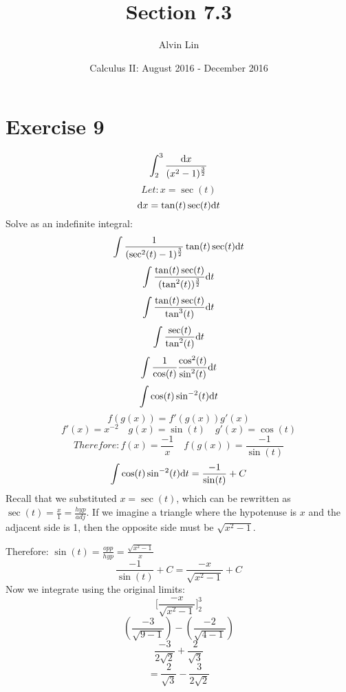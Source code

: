 \documentclass[letterpaper, 12pt]{math}
\title{Section 7.3}
\author{Alvin Lin}
\date{Calculus II: August 2016 - December 2016}
\begin{document}
\maketitle

\section*{Exercise 9}
\[ \int_{2}^{3}{\frac{\mathrm{d}{x}}{(x^{2}-1)^{\frac{3}{2}}}} \]
\[ Let: x = \sec(t) \]
\[ \mathrm{d}{x} = \tan(t)\sec(t)\mathrm{d}{t} \]
Solve as an indefinite integral:
\[ \int{\frac{1}{(\sec^{2}(t)-1)^{\frac{3}{2}}}\tan(t)\sec(t)\mathrm{d}{t}} \]
\[ \int{\frac{\tan(t)\sec(t)}{(\tan^{2}(t))^{\frac{3}{2}}}\mathrm{d}{t}} \]
\[ \int{\frac{\tan(t)\sec(t)}{\tan^{3}(t)}\mathrm{d}{t}} \]
\[ \int{\frac{\sec(t)}{\tan^{2}(t)}\mathrm{d}{t}} \]
\[ \int{\frac{1}{\cos(t)}\frac{\cos^{2}(t)}{\sin^{2}(t)}\mathrm{d}{t}} \]
\[ \int{\cos(t)\sin^{-2}(t)\mathrm{d}{t}} \]
\[ f(g(x)) = f'(g(x))g'(x) \]
\[ f'(x) = x^{-2} \quad g(x) = \sin(t) \quad g'(x) = \cos(t) \]
\[ Therefore: f(x) = \frac{-1}{x} \quad f(g(x)) = \frac{-1}{\sin(t)} \]
\[ \int{\cos(t)\sin^{-2}(t)\mathrm{d}{t}} = \frac{-1}{\sin(t)}+C \]
Recall that we substituted \( x = \sec(t) \), which can be rewritten as
\( \sec(t) = \frac{x}{1} = \frac{hyp}{adj} \). If we imagine a triangle where
the hypotenuse is \( x \) and the adjacent side is 1, then the opposite side
must be \( \sqrt{x^{2}-1} \).
\begin{center}
\end{center}
Therefore: \( \sin(t) = \frac{opp}{hyp} = \frac{\sqrt{x^{2}-1}}{x} \)
\[ \frac{-1}{\sin(t)}+C = \frac{-x}{\sqrt{x^{2}-1}}+C \]
Now we integrate using the original limits:
\[ \bigg[\frac{-x}{\sqrt{x^{2}-1}}\bigg]_{2}^{3} \]
\[ (\frac{-3}{\sqrt{9-1}})-(\frac{-2}{\sqrt{4-1}}) \]
\[ \frac{-3}{2\sqrt{2}}+\frac{2}{\sqrt{3}} \]
\[ = \frac{2}{\sqrt{3}}-\frac{3}{2\sqrt{2}} \]
\end{document}
